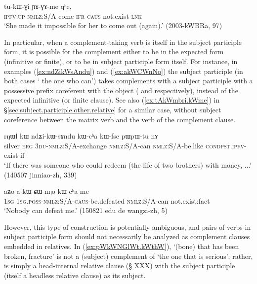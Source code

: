  \begin{exe}
\ex \label{ex:tukWGi.YAGAme}
 \gll   tu-kɯ-ɣi ɲɤ-ɣɤ-me qʰe,  \\
  \textsc{ipfv}:\textsc{up}-\textsc{nmlz}:S/A-come \textsc{ifr}-\textsc{caus}-not.exist \textsc{lnk} \\
  \glt `She made it impossible for her to come out (again).' (2003-kWBRa, 97)
 \end{exe}
 
In particular, when a complement-taking verb is itself in the subject participle form, it is possible for the complement either to be in the expected form (infinitive or finite), or to be in subject participle form itself. For instance, in examples (\ref{ex:ndZikWsAndu}) and (\ref{ex:akWCWnNo})  the subject participle (in both cases  ` the one who can') takes complements with a subject participle with a possessive prefix coreferent with the object ( and  respectively), instead of the expected  infinitive (or finite clause). See also (\ref{ex:tAkWmbri.kWme}) in §\ref{sec:subject.participle.other.relative} for a similar case, without subject coreference between the matrix verb and the verb of the complement clause.

\begin{exe}
\ex \label{ex:ndZikWsAndu}
\gll  rŋɯl kɯ ndʑi-kɯ-sɤndu kɯ-cʰa kɯ-fse pɯ\redp{}pɯ-tu nɤ  \\
silver \textsc{erg} \textsc{3du-nmlz}:S/A-exchange \textsc{nmlz}:S/A-can \textsc{nmlz}:S/A-be.like 
\textsc{cond}\redp{}\textsc{pst.ipfv}-exist if \\
\glt `If there was someone who could redeem (the life of two brothers) with money, ...' (140507 jinniao-zh, 339)
\end{exe}

\begin{exe}
\ex \label{ex:akWCWnNo}
\gll  aʑo a-kɯ-ɕɯ-nŋo kɯ-cʰa me  \\
\textsc{1sg} \textsc{1sg}.\textsc{poss}-\textsc{nmlz}:S/A-\textsc{caus}-be.defeated \textsc{nmlz}:S/A-can not.exist:fact \\
 \glt `Nobody can defeat me.' (150821 edu de wangzi-zh, 5)
 \end{exe}
 
However, this type of construction is potentially ambiguous, and pairs of verbs in subject participle form should not necessarily be analyzed as complement clauses embedded in relatives. In (\ref{ex:pWkWNGlWt.kWthW}),  `(bone) that has been broken, fracture' is not a (subject) complement of   `the one that is serious'; rather,  is simply a head-internal relative clause (§ XXX) with the subject participle (itself a headless relative clause)  as its subject. 

